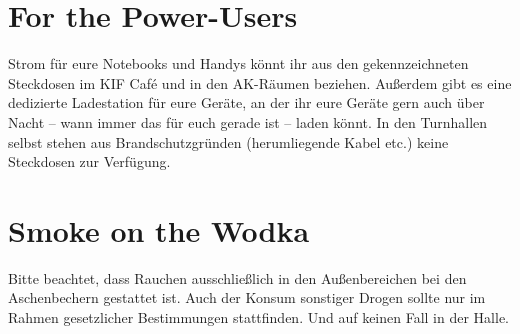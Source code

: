 \section*{For the Power-Users}

Strom für eure Notebooks und Handys könnt ihr aus den gekennzeichneten Steckdosen im KIF Café und in den AK-Räumen beziehen.
Außerdem gibt es eine dedizierte Ladestation für eure Geräte, an der ihr eure Geräte gern auch über Nacht -- wann immer das für euch gerade ist -- laden könnt.
In den Turnhallen selbst stehen aus Brandschutzgründen (herumliegende Kabel etc.) keine Steckdosen zur Verfügung.

\section*{Smoke on the Wodka}

Bitte beachtet, dass Rauchen ausschließlich in den Außenbereichen bei den Aschenbechern gestattet ist.
Auch der Konsum sonstiger Drogen sollte nur im Rahmen gesetzlicher Bestimmungen stattfinden. Und auf keinen Fall in der Halle.
